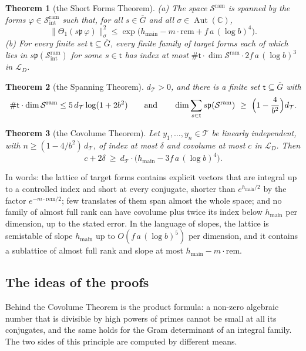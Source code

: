 \documentclass[10pt]{amsart}
\newtheorem{theorem}{Theorem}[section]
\theoremstyle{definition}
\theoremstyle{remark}
\newcommand{\C}{\mathbb C}
\newcommand{\cT}{\mathcal T}
\newcommand{\cS}{\mathcal S^{\mathrm{ram}}}
\newcommand{\cSi}{\mathcal S^{\mathrm{ram}}_{\mathrm{int}}}
\newcommand{\cL}{\mathcal L_D}
\newcommand{\dT}{d_{\mathcal T}}
\newcommand{\hmain}{h_{\mathrm{main}}}
\newcommand{\rem}{\mathrm{rem}}
\newcommand{\pp}{\mathfrak p}
\newcommand{\Gbar}{\overline G}
\begin{document}
\begin{theorem}[the Short Forms Theorem]\label{thm:SF}
\textup{(a)} The space $\cS$ is spanned by the forms $\varphi\in\cSi$ such that, for all
$s\in\Gbar$ and all $\sigma\in\operatorname{Aut}(\C)$,
\[
 \bigl\|\Theta_1(s\pp\,\varphi)\bigr\|_\sigma^2\le\exp\bigl(\hmain-m\cdot\rem+f\,a\,(\log b)^4\bigr).
\]
\textup{(b)} For every finite set $\mathsf t\subseteq\Gbar$, every finite family of target forms
each of which lies in $s\pp(\cSi)$ for some $s\in\mathsf t$ has index at most
$\#\mathsf t\cdot\dim\cS\cdot2f\,a\,(\log b)^3$ in $\cL$.
\end{theorem}
\begin{theorem}[the Spanning Theorem]\label{thm:Sp}
$\dT>0$, and there is a finite set $\mathsf t\subseteq\Gbar$ with
\[
 \#\mathsf t\cdot\dim\cS\le5\,\dT\log(1+2b^2)\qquad\text{and}\qquad
 \dim\sum_{s\in\mathsf t}s\pp(\cS)\ \ge\ \Bigl(1-\frac4{b^2}\Bigr)\dT .
\]
\end{theorem}
\begin{theorem}[the Covolume Theorem]\label{thm:Cv}
Let $y_1,\dots,y_n\in\cT$ be linearly independent, with $n\ge(1-4/b^2)\,\dT$, of index at most
$\delta$ and covolume at most $c$ in $\cL$. Then
\[
 c+2\delta\ \ge\ \dT\cdot\bigl(\hmain-3f\,a\,(\log b)^4\bigr).
\]
\end{theorem}
In words: the lattice of target forms contains explicit vectors that are integral up to a
controlled index and short at every conjugate, shorter than $e^{\hmain/2}$ by the factor
$e^{-m\cdot\rem/2}$; few translates of them span almost the whole space; and no family of almost
full rank can have covolume plus twice its index below $\hmain$ per dimension, up to the stated
error. In the language of slopes, the lattice is semistable of slope $\hmain$ up to
$O(f\,a\,(\log b)^5)$ per dimension, and it contains a sublattice of almost full rank and slope
at most $\hmain-m\cdot\rem$.

\subsection{The ideas of the proofs}
Behind the Covolume Theorem is the product formula: a non-zero algebraic number that is
divisible by high powers of primes cannot be small at all its conjugates, and the same holds
for the Gram determinant of an integral family. The two sides of this principle are computed
by different means.
\end{document}

